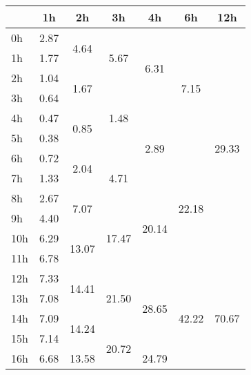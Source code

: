 \begin{center}
\begin{tabular}{l || c | c | c | c | c | c |}\hline
 & 1h & 2h & 3h & 4h & 6h & 12h \\\hline
0h & \multirow{1}{*}{ 2.87 }  & \multirow{2}{*}{ 4.64 }  & \multirow{3}{*}{ 5.67 }  & \multirow{4}{*}{ 6.31 }  & \multirow{6}{*}{ 7.15 }  & \multirow{12}{*}{ 29.33 }  \\\cline{1-1}
1h & \multirow{1}{*}{ 1.77 }  & & & & & \\\cline{1-1}\cline{2-2}
2h & \multirow{1}{*}{ 1.04 }  & \multirow{2}{*}{ 1.67 }  & & & & \\\cline{1-1}\cline{3-3}
3h & \multirow{1}{*}{ 0.64 }  & & \multirow{3}{*}{ 1.48 }  & & & \\\cline{1-1}\cline{2-2}\cline{4-4}
4h & \multirow{1}{*}{ 0.47 }  & \multirow{2}{*}{ 0.85 }  & & \multirow{4}{*}{ 2.89 }  & & \\\cline{1-1}
5h & \multirow{1}{*}{ 0.38 }  & & & & & \\\cline{1-1}\cline{2-2}\cline{3-3}\cline{5-5}
6h & \multirow{1}{*}{ 0.72 }  & \multirow{2}{*}{ 2.04 }  & \multirow{3}{*}{ 4.71 }  & & \multirow{6}{*}{ 22.18 }  & \\\cline{1-1}
7h & \multirow{1}{*}{ 1.33 }  & & & & & \\\cline{1-1}\cline{2-2}\cline{4-4}
8h & \multirow{1}{*}{ 2.67 }  & \multirow{2}{*}{ 7.07 }  & & \multirow{4}{*}{ 20.14 }  & & \\\cline{1-1}\cline{3-3}
9h & \multirow{1}{*}{ 4.40 }  & & \multirow{3}{*}{ 17.47 }  & & & \\\cline{1-1}\cline{2-2}
10h & \multirow{1}{*}{ 6.29 }  & \multirow{2}{*}{ 13.07 }  & & & & \\\cline{1-1}
11h & \multirow{1}{*}{ 6.78 }  & & & & & \\\cline{1-1}\cline{2-2}\cline{3-3}\cline{4-4}\cline{5-5}\cline{6-6}
12h & \multirow{1}{*}{ 7.33 }  & \multirow{2}{*}{ 14.41 }  & \multirow{3}{*}{ 21.50 }  & \multirow{4}{*}{ 28.65 }  & \multirow{6}{*}{ 42.22 }  & \multirow{12}{*}{ 70.67 }  \\\cline{1-1}
13h & \multirow{1}{*}{ 7.08 }  & & & & & \\\cline{1-1}\cline{2-2}
14h & \multirow{1}{*}{ 7.09 }  & \multirow{2}{*}{ 14.24 }  & & & & \\\cline{1-1}\cline{3-3}
15h & \multirow{1}{*}{ 7.14 }  & & \multirow{3}{*}{ 20.72 }  & & & \\\cline{1-1}\cline{2-2}\cline{4-4}
16h & \multirow{1}{*}{ 6.68 }  & \multirow{2}{*}{ 13.58 }  & & \multirow{4}{*}{ 24.79 }  & & \\\cline{1-1}

\end{tabular}
\end{center}
